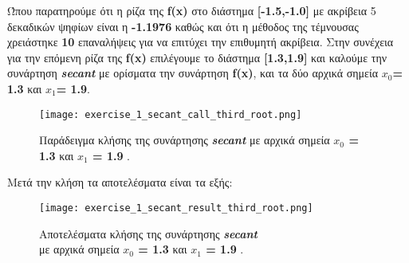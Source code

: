 \documentclass[First Project.tex]{subfiles}
\begin{document}
Ώπου παρατηρούμε ότι η ρίζα της \textlatin{\textbf{f(x)}} στο διάστημα \textlatin{\textbf{[-1.5,-1.0]}} με ακρίβεια 5 δεκαδικών ψηφίων 
είναι η \textbf{-1.1976} καθώς και ότι η μέθοδος της τέμνουσας χρειάστηκε \textbf{10} επαναλήψεις για να επιτύχει την 
επιθυμητή ακρίβεια. Στην συνέχεια για την επόμενη ρίζα της \textlatin{\textbf{f(x)}} επιλέγουμε το διάστημα \textlatin{\textbf{[1.3,1.9]}} και
καλούμε την συνάρτηση \textit{\textlatin{\textbf{secant}}} με ορίσματα την συνάρτηση \textlatin{\textbf{f(x)}}, και τα δύο αρχικά σημεία 
\textlatin{\textbf{$x_{0}$= 1.3}} και \textlatin{\textbf{$x_{1}$= 1.9}}.
\vspace{5px}
\begin{figure}[h!]
    \centering
    \captionsetup{justification=centering}
    \begin{center}
        \texttt{[image: exercise\_1\_secant\_call\_third\_root.png]}    
        \caption{ Παράδειγμα κλήσης της συνάρτησης \textit{\textlatin{\textbf{secant}}} με αρχικά σημεία \textbf{\textlatin{$x_{0}$ = 1.3}} 
                    και \textbf{\textlatin{$x_{1}$ = 1.9}} .}
    \end{center}
\end{figure}


Μετά την κλήση τα αποτελέσματα είναι τα εξής:
\vspace{5px}
\begin{figure}[h!]
    \centering
    \captionsetup{justification=centering}
    \begin{center}
    \texttt{[image: exercise\_1\_secant\_result\_third\_root.png]}    
    \caption{ Αποτελέσματα κλήσης της συνάρτησης \textit{\textlatin{\textbf{secant}}} \\ με αρχικά σημεία \textbf{\textlatin{$x_{0}$ = 1.3}} 
                και \textbf{\textlatin{$x_{1}$ = 1.9}} . }
    \end{center}
\end{figure}
\end{document}
